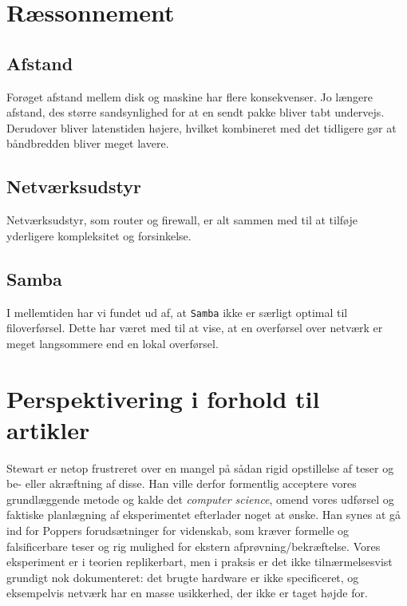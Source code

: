 \documentclass{article}
\begin{document}
\section{Ræssonnement}

\subsection{Afstand}
Forøget afstand mellem disk og maskine har flere konsekvenser. Jo længere afstand, des større sandsynlighed for at en sendt pakke bliver tabt undervejs. Derudover bliver latenstiden højere, hvilket kombineret med det tidligere gør at båndbredden bliver meget lavere.

\subsection{Netværksudstyr}
Netværksudstyr, som router og firewall, er alt sammen med til at tilføje yderligere kompleksitet og forsinkelse.

\subsection{Samba}

I mellemtiden har vi fundet ud af, at {\tt Samba} ikke er særligt optimal til filoverførsel. Dette har været med til at vise, at en overførsel over netværk er meget langsommere end en lokal overførsel.

\section{Perspektivering i forhold til artikler}

Stewart er netop frustreret over en mangel på sådan rigid opstillelse af teser og be- eller akræftning af disse. Han ville derfor formentlig acceptere vores grundlæggende metode og kalde det \textit{computer science}, omend vores udførsel og faktiske planlægning af eksperimentet efterlader noget at ønske. Han synes at gå ind for Poppers forudsætninger for videnskab, som kræver formelle og falsificerbare teser og rig mulighed for ekstern afprøvning/bekræftelse. Vores eksperiment er i teorien replikerbart, men i praksis er det ikke tilnærmelsesvist grundigt nok dokumenteret: det brugte hardware er ikke specificeret, og eksempelvis netværk har en masse usikkerhed, der ikke er taget højde for.   
\end{document}

